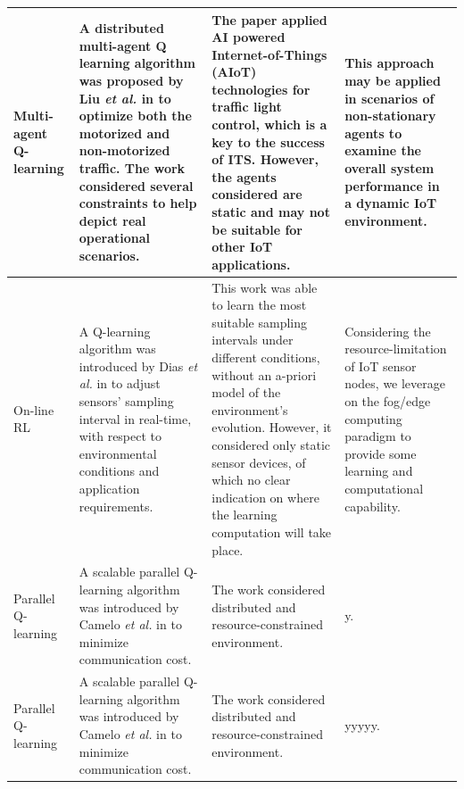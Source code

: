 \documentclass[journal]{IEEEtran}
\begin{document}
\begin{landscape}
\begin{tabular}{llll}
\multicolumn{1}{m{3cm}}{Multi-agent Q-learning} & \multicolumn{1}{m{6cm}}{A distributed multi-agent Q learning algorithm was proposed by Liu \emph{et al.} in \cite{Liu2017} to optimize both the motorized and non-motorized traffic. The work considered several constraints to help depict real operational scenarios.} & \multicolumn{1}{m{6cm}}{The paper applied AI powered Internet-of-Things (AIoT) technologies for traffic light control, which is a key to the success of ITS. However, the agents considered are static and may not be suitable for other IoT applications.} & \multicolumn{1}{m{6cm}}{This approach may be applied in scenarios of non-stationary agents to examine the overall system performance in a dynamic IoT environment.}\\ \hline


\multicolumn{1}{m{3cm}}{On-line RL} & \multicolumn{1}{m{6cm}}{A Q-learning algorithm was introduced by Dias \emph{et al.} in \cite{Dias2016} to adjust sensors' sampling interval in real-time, with respect to environmental conditions and application requirements.} & \multicolumn{1}{m{6cm}}{This work was able to learn the most suitable sampling intervals under different conditions, without an a-priori model of the environment's evolution. However, it considered only static sensor devices, of which no clear indication on where the learning computation will take place.} & \multicolumn{1}{m{6cm}}{Considering the resource-limitation of IoT sensor nodes, we leverage on the fog/edge computing paradigm to provide some learning and computational capability.}\\ \hline

\multicolumn{1}{m{3cm}}{Parallel Q-learning} & \multicolumn{1}{m{6cm}}{A scalable parallel Q-learning algorithm was introduced by Camelo \emph{et al.} in \cite{Camelo2016} to minimize communication cost.} & \multicolumn{1}{m{6cm}}{The work considered distributed and resource-constrained environment.} & \multicolumn{1}{m{6cm}}{y.}\\ \hline

\multicolumn{1}{m{3cm}}{Parallel Q-learning} & \multicolumn{1}{m{6cm}}{A scalable parallel Q-learning algorithm was introduced by Camelo \emph{et al.} in \cite{Camelo2016} to minimize communication cost.} & \multicolumn{1}{m{6cm}}{The work considered distributed and resource-constrained environment.} & \multicolumn{1}{m{6cm}}{yyyyy.}\\ \hline

\hline
 \end{tabular}
\end{landscape}
\end{document}

